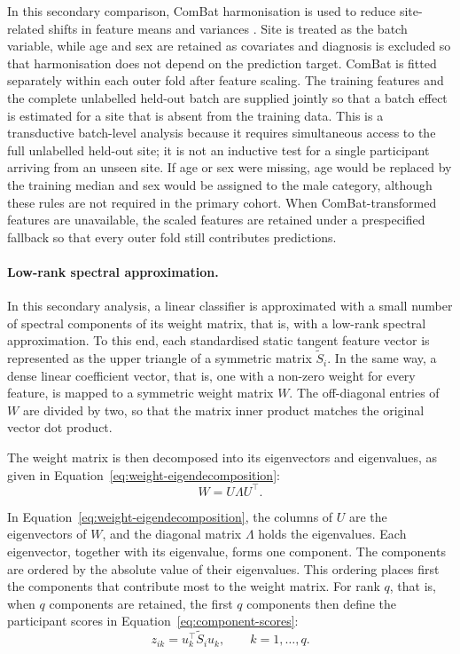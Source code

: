 In this secondary comparison, ComBat harmonisation is used to reduce site-related shifts in feature means and variances \citep{Johnsonetal2007,Fortinetal2018}. Site is treated as the batch variable, while age and sex are retained as covariates and diagnosis is excluded so that harmonisation does not depend on the prediction target. ComBat is fitted separately within each outer fold after feature scaling. The training features and the complete unlabelled held-out batch are supplied jointly so that a batch effect is estimated for a site that is absent from the training data. This is a transductive batch-level analysis because it requires simultaneous access to the full unlabelled held-out site; it is not an inductive test for a single participant arriving from an unseen site. If age or sex were missing, age would be replaced by the training median and sex would be assigned to the male category, although these rules are not required in the primary cohort. When ComBat-transformed features are unavailable, the scaled features are retained under a prespecified fallback so that every outer fold still contributes predictions.


\paragraph{\textbf{Low-rank spectral approximation.}}
\label{par:low-rank-spectral}
In this secondary analysis, a linear classifier is approximated with a small number of
spectral components of its weight matrix, that is, with a low-rank spectral approximation.
To this end, each standardised static tangent feature vector is represented as the upper
triangle of a symmetric matrix $\widetilde{S}_i$. In the same way, a dense linear
coefficient vector, that is, one with a non-zero weight for every feature, is mapped to a
symmetric weight matrix $W$. The off-diagonal entries of $W$ are divided by two, so that
the matrix inner product matches the original vector dot product.

The weight matrix is then decomposed into its eigenvectors and eigenvalues, as given in
Equation~\eqref{eq:weight-eigendecomposition}:
\begin{equation}
W
=
U\Lambda U^\top.
\label{eq:weight-eigendecomposition}
\end{equation}

In Equation~\eqref{eq:weight-eigendecomposition}, the columns of $U$ are the eigenvectors of $W$, and the diagonal
matrix $\Lambda$ holds the eigenvalues. Each eigenvector, together with its eigenvalue,
forms one component. The components are ordered by the absolute value of their eigenvalues.
This ordering places first the components that contribute most to the weight matrix. For
rank $q$, that is, when $q$ components are retained, the first $q$ components then define
the participant scores in Equation~\eqref{eq:component-scores}:
\begin{equation}
z_{ik}
=
u_k^\top \widetilde{S}_i u_k,
\qquad k=1,\ldots,q.
\label{eq:component-scores}
\end{equation}

